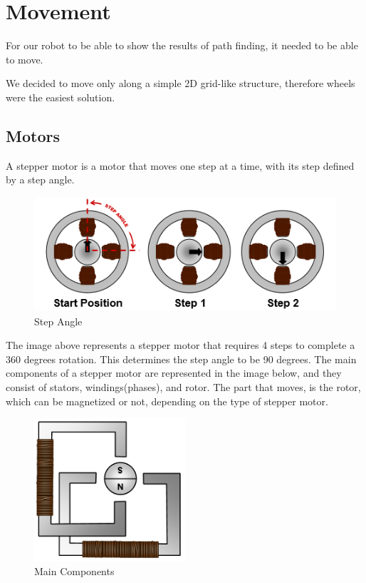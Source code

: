 \chapter{Movement}\label{ch:move}
For our robot to be able to show the results of path finding,
it needed to be able to move.

We decided to move only along a simple 2D grid-like structure,
therefore wheels were the easiest solution.
\section{Motors}\label{sec:motors}
A stepper motor is a motor that moves one step at a time, with its step defined by a step angle.

\begin{figure}[h]
	\centering
	\includegraphics[width=\textwidth]{figures/motor1.png}
	\caption{Step Angle}
\end{figure}

The image above represents a stepper motor that requires 4 steps to complete a 360 degrees rotation. This determines the step angle to be 90 degrees. 
The main components of a stepper motor are represented in the image below, and they consist of stators, windings(phases), and rotor.
The part that moves, is the rotor, which can be magnetized or not, depending on the type of stepper motor.

\begin{figure}[h]
	\centering
	\includegraphics[width=0.5\textwidth]{figures/motor2.png}
	\caption{Main Components}
\end{figure}

